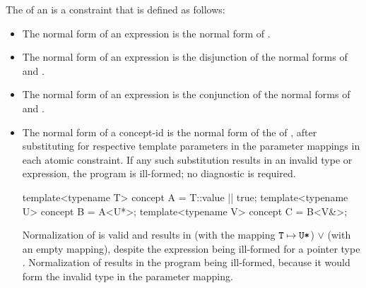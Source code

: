 \documentclass{wg21}
\begin{document}
\pnum
The  of an   is
a constraint that is defined as follows:
%
\begin{itemize}
\item
The normal form of an expression  is
the normal form of .

\item
The normal form of an expression  is
the disjunction of
the normal forms of  and .

\item
The normal form of an expression 
is the conjunction of
the normal forms of  and .

\item
The normal form of a concept-id 
is the normal form of the  of ,
after substituting  for
 respective template parameters in the
parameter mappings in each atomic constraint.
If any such substitution results in an invalid type or expression,
the program is ill-formed; no diagnostic is required.
\begin{example}
\begin{codeblock}
    template<typename T> concept A = T::value || true;
    template<typename U> concept B = A<U*>;
    template<typename V> concept C = B<V&>;
\end{codeblock}
Normalization of  
is valid and results in
 (with the mapping $\texttt{T} \mapsto \texttt{U*}$)
$\lor$
 (with an empty mapping),
despite the expression  being ill-formed
for a pointer type .
Normalization of  
results in the program being ill-formed,
because it would form the invalid type 
in the parameter mapping.
\end{example}


\end{itemize}
\end{document}
